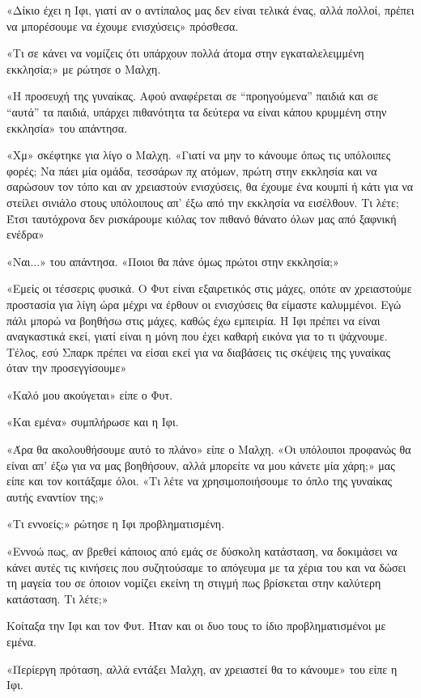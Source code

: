 \documentclass[12pt,twoside, openany]{book}
\begin{document}
«Δίκιο έχει η Ιφι, γιατί αν ο αντίπαλος μας δεν είναι τελικά ένας, αλλά πολλοί, πρέπει να μπορέσουμε να έχουμε ενισχύσεις» πρόσθεσα.

«Τι σε κάνει να νομίζεις ότι υπάρχουν πολλά άτομα στην εγκαταλελειμμένη εκκλησία;» με ρώτησε ο Μαλχη.

«Η προσευχή της γυναίκας. Αφού αναφέρεται σε “προηγούμενα” παιδιά και σε “αυτά” τα παιδιά, υπάρχει πιθανότητα τα δεύτερα να είναι κάπου κρυμμένη στην εκκλησία» του απάντησα.

«Χμ» σκέφτηκε για λίγο ο Μαλχη. «Γιατί να μην το κάνουμε όπως τις υπόλοιπες φορές; Να πάει μία ομάδα, τεσσάρων πχ ατόμων, πρώτη στην εκκλησία και να σαρώσουν τον τόπο και αν χρειαστούν ενισχύσεις, θα έχουμε ένα κουμπί ή κάτι για να στείλει σινιάλο στους υπόλοιπους απ’ έξω από την εκκλησία να εισέλθουν. Τι λέτε; Έτσι ταυτόχρονα δεν ρισκάρουμε κιόλας τον πιθανό θάνατο όλων μας από ξαφνική ενέδρα»

«Ναι...» του απάντησα. «Ποιοι θα πάνε όμως πρώτοι στην εκκλησία;»

«Εμείς οι τέσσερις φυσικά. Ο Φυτ είναι εξαιρετικός στις μάχες, οπότε αν χρειαστούμε προστασία για λίγη ώρα μέχρι να έρθουν οι ενισχύσεις θα είμαστε καλυμμένοι. Εγώ πάλι μπορώ να βοηθήσω στις μάχες, καθώς έχω εμπειρία. Η Ιφι πρέπει να είναι αναγκαστικά εκεί, γιατί είναι η μόνη που έχει καθαρή εικόνα για το τι ψάχνουμε. Τέλος, εσύ Σπαρκ πρέπει να είσαι εκεί για να διαβάσεις τις σκέψεις της γυναίκας όταν την προσεγγίσουμε»

«Καλό μου ακούγεται» είπε ο Φυτ.

«Και εμένα» συμπλήρωσε και η Ιφι.

«Άρα θα ακολουθήσουμε αυτό το πλάνο» είπε ο Μαλχη. «Οι υπόλοιποι προφανώς θα είναι απ’ έξω για να μας βοηθήσουν, αλλά μπορείτε να μου κάνετε μία χάρη;» μας είπε και τον κοιτάξαμε όλοι. «Τι λέτε να χρησιμοποιήσουμε το όπλο της γυναίκας αυτής εναντίον της;»

«Τι εννοείς;» ρώτησε η Ιφι προβληματισμένη.

«Εννοώ πως, αν βρεθεί κάποιος από εμάς σε δύσκολη κατάσταση, να δοκιμάσει να κάνει αυτές τις κινήσεις που συζητούσαμε το απόγευμα με τα χέρια του και να δώσει τη μαγεία του σε όποιον νομίζει εκείνη τη στιγμή πως βρίσκεται στην καλύτερη κατάσταση. Τι λέτε;»

Κοίταξα την Ιφι και τον Φυτ. Ήταν και οι δυο τους το ίδιο προβληματισμένοι με εμένα.

«Περίεργη πρόταση, αλλά εντάξει Μαλχη, αν χρειαστεί θα το κάνουμε» του είπε η Ιφι.
\end{document}
